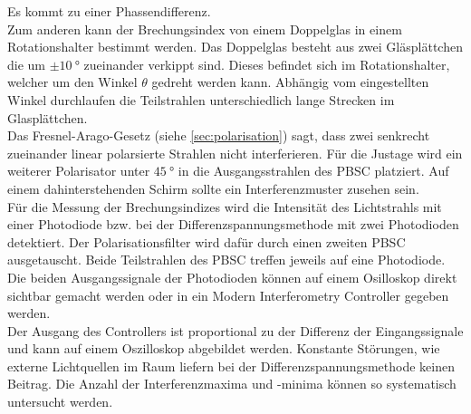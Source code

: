 Es kommt zu einer Phassendifferenz.
\\
Zum anderen kann der Brechungsindex von einem Doppelglas in einem Rotationshalter bestimmt werden.
Das Doppelglas besteht aus zwei Gläsplättchen die um $\pm \qty{10}{\degree}$ zueinander verkippt sind.
Dieses befindet sich im Rotationshalter, welcher um den Winkel $\theta$ gedreht werden kann.
Abhängig vom eingestellten Winkel durchlaufen die Teilstrahlen unterschiedlich lange Strecken im Glasplättchen.
\\
Das Fresnel-Arago-Gesetz (siehe \autoref{sec:polarisation}) sagt, dass zwei senkrecht zueinander linear polarsierte Strahlen nicht interferieren.
Für die Justage wird ein weiterer Polarisator unter $\qty{45}{\degree}$ in die Ausgangsstrahlen des PBSC platziert.
Auf einem dahinterstehenden Schirm sollte ein Interferenzmuster zusehen sein.
\\
Für die Messung der Brechungsindizes wird die Intensität des Lichtstrahls mit einer Photodiode bzw. bei der Differenzspannungsmethode mit zwei Photodioden detektiert.
Der Polarisationsfilter wird dafür durch einen zweiten PBSC ausgetauscht.
Beide Teilstrahlen des PBSC treffen jeweils auf eine Photodiode.
Die beiden Ausgangssignale der Photodioden können auf einem Osilloskop direkt sichtbar gemacht werden oder in ein Modern Interferometry Controller gegeben werden.
\\
Der Ausgang des Controllers ist proportional zu der Differenz der Eingangssignale und kann auf einem Oszilloskop abgebildet werden.
Konstante Störungen, wie externe Lichtquellen im Raum liefern bei der Differenzspannungsmethode keinen Beitrag.
Die Anzahl der Interferenzmaxima und -minima können so systematisch untersucht werden.